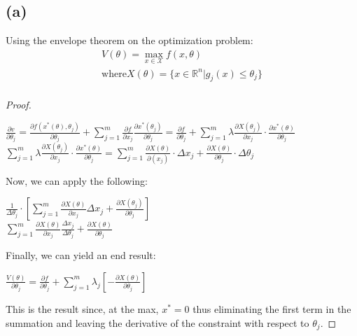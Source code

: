 \documentclass[10pt, a4paper]{article}
\begin{document}
    \subsection*{(a)}
        Using the envelope theorem on the optimization problem:
        \begin{gather*}
        V(\theta)=\max_{x\in\mathcal{X}} f(x,\theta) \\
        \text{where} X(\theta) = \{x\in\mathbb{R}^n|g_j(x)\leq\theta_j\} \\
        \end{gather*}
        \begin{proof}
        \begin{center}
            $\frac{\partial v}{\partial\theta_j} = \frac{\partial f(x^*(\theta),\theta_j)}{\partial\theta_j}
            +\sum\limits_{j=1}^m\frac{\partial f}{\partial x_j}\frac{\partial x^*(\theta_j)}{\partial\theta_j}
            = \frac{\partial f}{\partial\theta_j} + \sum\limits_{j=1}^m\lambda\frac{\partial X(\theta_j)}{\partial x_j}
            \cdot\frac{\partial x^*(\theta)}{\partial\theta_j}$ \\
            $\sum\limits_{j=1}^m\lambda\frac{\partial X(\theta_j)}{\partial x_j}\cdot\frac{\partial x^*(\theta)}{\partial\theta_j}
            = \sum\limits_{j=1}^m\frac{\partial X(\theta)}{\partial(x_j)}\cdot\Delta x_j + \frac{\partial X(\theta)}{\partial\theta_j}\cdot\Delta\theta_j$ \\
        \end{center}
        Now, we can apply the following:
        \begin{center}
            $\frac{1}{\Delta\theta_j}\cdot[\sum\limits_{j=1}^m\frac{\partial X(\theta)}{\partial x_j}\Delta x_j +
            \frac{\partial X(\theta_j)}{\partial\theta_j}]$ \\
            $\sum\limits_{j=1}^m\frac{\partial X(\theta)}{\partial x_j}\frac{\Delta x_j}{\Delta\theta_j} +
            \frac{\partial X(\theta)}{\partial\theta_j}$ \\
        \end{center}
        Finally, we can yield an end result:
        \begin{center}
            $\boxed{\frac{V(\theta)}{\partial\theta_j} = \frac{\partial f}{\partial \theta_j} +\sum\limits_{j=1}^m \lambda_j[-\frac{\partial X(\theta)}{\partial\theta_j}]}$
        \end{center}
        This is the result since, at the max, $x^*=0$ thus eliminating the first term in the summation and leaving the derivative of the
        constraint with respect to $\theta_j$.
        \end{proof}
\end{document}

